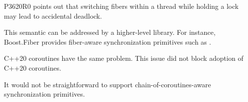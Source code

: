 
P3620R0 points out that switching fibers within a thread while holding a lock
may lead to accidental deadlock.

This semantic can be addressed by a higher-level library. For instance,
Boost.Fiber\cite{bfiber} provides fiber-aware synchronization primitives such as
\href{https://www.boost.org/doc/libs/release/libs/fiber/doc/html/fiber/synchronization/mutex_types.html}
{}.

C++20 coroutines have the same problem. This issue did not block adoption of
C++20 coroutines.

It would not be straightforward to support chain-of-coroutines-aware
synchronization primitives.
